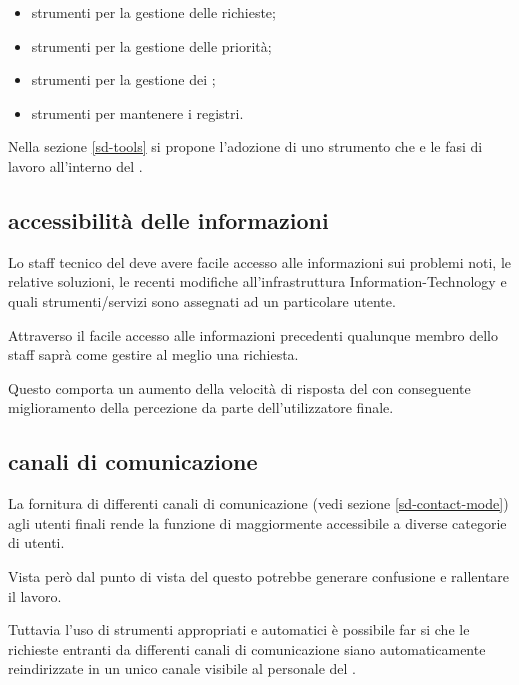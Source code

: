 \begin{itemize}
\item{strumenti per la gestione delle richieste;}
\item{strumenti per la gestione delle priorità;}
\item{strumenti per la gestione dei ;}
\item{strumenti per mantenere i registri.}
\end{itemize}

Nella sezione \ref{sd-tools} si propone l'adozione di uno strumento  che  e  le fasi di lavoro all'interno del .

\subsection[Accessibilità delle informazioni]{accessibilità delle informazioni}
\label{sd-users-experience-accessibility}
Lo staff tecnico del  deve avere facile accesso alle informazioni sui problemi noti, le relative soluzioni, le recenti modifiche all'infrastruttura \acs{Information-Technology} e quali strumenti/servizi sono assegnati ad un particolare utente.

Attraverso il facile accesso alle informazioni precedenti qualunque membro dello staff saprà come gestire al meglio una richiesta.

Questo comporta un aumento della velocità di risposta del  con conseguente miglioramento della percezione da parte dell'utilizzatore finale.

\subsection[Canali di comunicazione]{canali di comunicazione}
\label{sd-users-experience-communication}
La fornitura di differenti canali di comunicazione (vedi sezione \ref{sd-contact-mode}) agli utenti finali rende la funzione di  maggiormente accessibile a diverse categorie di utenti.

Vista però dal punto di vista del  questo potrebbe generare confusione e rallentare il lavoro.

Tuttavia l'uso di strumenti appropriati e automatici è possibile far si che le richieste entranti da differenti canali di comunicazione siano automaticamente reindirizzate in un unico canale visibile al personale del .

